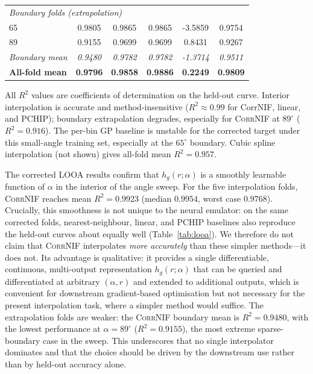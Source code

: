 \documentclass[aip,amsmath,amssymb,reprint]{revtex4-1}
\newcommand{\dang}{\ensuremath{\alpha}}
\begin{document}
\begin{table}[htbp]
\begin{tabular}{lccccc}
    \midrule
    \multicolumn{6}{l}{\emph{Boundary folds (extrapolation)}}\\
    65 & 0.9805 & 0.9865 & 0.9865 & -3.5859 & 0.9754 \\
    89 & 0.9155 & 0.9699 & 0.9699 & 0.8431 & 0.9267 \\
    \textit{Boundary mean} & \textit{0.9480} & \textit{0.9782} & \textit{0.9782} & \textit{-1.3714} & \textit{0.9511} \\
    \midrule
    \textbf{All-fold mean} & \textbf{0.9796} & \textbf{0.9858} & \textbf{0.9886} & \textbf{0.2249} & \textbf{0.9809} \\
    \bottomrule
  \end{tabular}
  \par\smallskip
  \noindent\small All $R^2$ values are coefficients of determination on the
  held-out curve. Interior interpolation is accurate and method-insensitive
  ($R^2 \approx 0.99$ for CorrNIF, linear, and PCHIP); boundary extrapolation
  degrades, especially for \textsc{CorrNIF} at $89^{\circ}$ ($R^2 = 0.916$).
  The per-bin GP baseline is unstable for the corrected target under this
  small-angle training set, especially at the $65^{\circ}$ boundary. Cubic
  spline interpolation (not shown) gives all-fold mean $R^2 = 0.957$.
\end{table}

The corrected LOOA results confirm that $h_g(r;\dang)$ is a smoothly
learnable function of $\dang$ in the interior of the angle sweep.
For the five interpolation folds, \textsc{CorrNIF} reaches mean
$R^2 = 0.9923$ (median $0.9954$, worst case $0.9768$).
Crucially, this smoothness is not unique to the neural emulator: on the
same corrected folds, nearest-neighbour, linear, and PCHIP baselines also
reproduce the held-out curves about equally well (Table~\ref{tab:looa}).
We therefore do not claim that \textsc{CorrNIF} interpolates
\emph{more accurately} than these simpler methods---it does not.
Its advantage is qualitative: it provides a single differentiable,
continuous, multi-output representation $h_g(r;\dang)$ that can be queried
and differentiated at arbitrary $(\dang,r)$ and extended to additional
outputs, which is convenient for downstream gradient-based optimisation but
not necessary for the present interpolation task, where a simpler method
would suffice.
The extrapolation folds are weaker: the \textsc{CorrNIF} boundary mean is
$R^2 = 0.9480$, with the lowest performance at $\dang = 89^{\circ}$
($R^2 = 0.9155$), the most extreme sparse-boundary case in the sweep.
This underscores that no single interpolator dominates and that the choice
should be driven by the downstream use rather than by held-out accuracy
alone.
\end{document}
